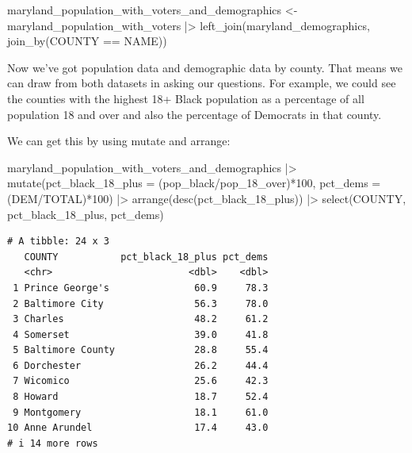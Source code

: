 \documentclass[
  letterpaper,
  DIV=11,
  numbers=noendperiod]{scrreprt}
\newenvironment{Shaded}{\begin{snugshade}}{\end{snugshade}}
\newcommand{\AttributeTok}[1]{\textcolor[rgb]{0.40,0.45,0.13}{#1}}
\newcommand{\DecValTok}[1]{\textcolor[rgb]{0.68,0.00,0.00}{#1}}
\newcommand{\FunctionTok}[1]{\textcolor[rgb]{0.28,0.35,0.67}{#1}}
\newcommand{\NormalTok}[1]{\textcolor[rgb]{0.00,0.23,0.31}{#1}}
\newcommand{\OtherTok}[1]{\textcolor[rgb]{0.00,0.23,0.31}{#1}}
\newcommand{\SpecialCharTok}[1]{\textcolor[rgb]{0.37,0.37,0.37}{#1}}
\begin{document}
\begin{Shaded}
\begin{Highlighting}[]
\NormalTok{maryland\_population\_with\_voters\_and\_demographics }\OtherTok{\textless{}{-}}\NormalTok{ maryland\_population\_with\_voters }\SpecialCharTok{|\textgreater{}} \FunctionTok{left\_join}\NormalTok{(maryland\_demographics, }\FunctionTok{join\_by}\NormalTok{(COUNTY }\SpecialCharTok{==}\NormalTok{ NAME))}
\end{Highlighting}
\end{Shaded}

Now we've got population data and demographic data by county. That means
we can draw from both datasets in asking our questions. For example, we
could see the counties with the highest 18+ Black population as a
percentage of all population 18 and over and also the percentage of
Democrats in that county.

We can get this by using mutate and arrange:

\begin{Shaded}
\begin{Highlighting}[]
\NormalTok{maryland\_population\_with\_voters\_and\_demographics }\SpecialCharTok{|\textgreater{}}
  \FunctionTok{mutate}\NormalTok{(}\AttributeTok{pct\_black\_18\_plus =}\NormalTok{ (pop\_black}\SpecialCharTok{/}\NormalTok{pop\_18\_over)}\SpecialCharTok{*}\DecValTok{100}\NormalTok{, }\AttributeTok{pct\_dems =}\NormalTok{ (DEM}\SpecialCharTok{/}\NormalTok{TOTAL)}\SpecialCharTok{*}\DecValTok{100}\NormalTok{) }\SpecialCharTok{|\textgreater{}}
  \FunctionTok{arrange}\NormalTok{(}\FunctionTok{desc}\NormalTok{(pct\_black\_18\_plus)) }\SpecialCharTok{|\textgreater{}}
  \FunctionTok{select}\NormalTok{(COUNTY, pct\_black\_18\_plus, pct\_dems)}
\end{Highlighting}
\end{Shaded}

\begin{verbatim}
# A tibble: 24 x 3
   COUNTY           pct_black_18_plus pct_dems
   <chr>                        <dbl>    <dbl>
 1 Prince George's               60.9     78.3
 2 Baltimore City                56.3     78.0
 3 Charles                       48.2     61.2
 4 Somerset                      39.0     41.8
 5 Baltimore County              28.8     55.4
 6 Dorchester                    26.2     44.4
 7 Wicomico                      25.6     42.3
 8 Howard                        18.7     52.4
 9 Montgomery                    18.1     61.0
10 Anne Arundel                  17.4     43.0
# i 14 more rows
\end{verbatim}
\end{document}
